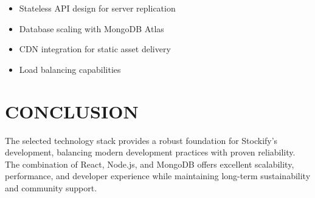 \begin{itemize}
\item Stateless API design for server replication
\item Database scaling with MongoDB Atlas
\item CDN integration for static asset delivery
\item Load balancing capabilities
\end{itemize}

\section{CONCLUSION}

The selected technology stack provides a robust foundation for Stockify's development, balancing modern development practices with proven reliability. The combination of React, Node.js, and MongoDB offers excellent scalability, performance, and developer experience while maintaining long-term sustainability and community support.